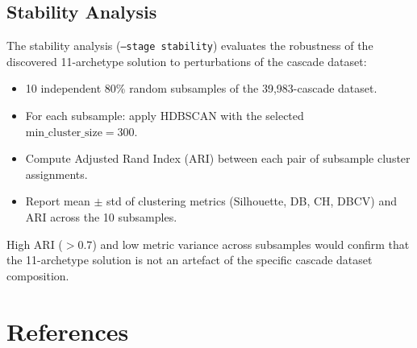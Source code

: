 \documentclass[12pt, a4paper]{article}
\begin{document}
\subsection{Stability Analysis}

The stability analysis (\texttt{--stage stability}) evaluates the robustness of the discovered 11-archetype solution to perturbations of the cascade dataset:

\begin{itemize}
  \item 10 independent 80\% random subsamples of the 39,983-cascade dataset.
  \item For each subsample: apply HDBSCAN with the selected $\text{min\_cluster\_size} = 300$.
  \item Compute Adjusted Rand Index (ARI) between each pair of subsample cluster assignments.
  \item Report mean $\pm$ std of clustering metrics (Silhouette, DB, CH, DBCV) and ARI across the 10 subsamples.
\end{itemize}

High ARI ($> 0.7$) and low metric variance across subsamples would confirm that the 11-archetype solution is not an artefact of the specific cascade dataset composition.

\section*{References}
\end{document}
